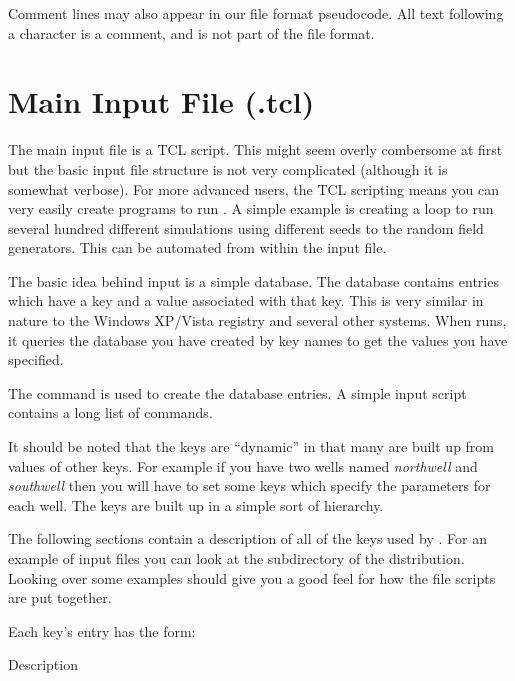 Comment lines may also appear in our file format pseudocode.
All text following a \code{#} character is a comment,
and is not part of the file format.


\section{Main Input File (.tcl)}
\label{Main Input File (.tcl)}

The main \parflow{} input file is a TCL script.  This might seem
overly combersome at first but the basic input file structure is not
very complicated (although it is somewhat verbose).  For more advanced
users, the TCL scripting means you can very easily create programs to
run \parflow{}.  A simple example is creating a loop to run several
hundred different simulations using different seeds to the random field
generators.  This can be automated from within the \parflow{} input file.

The basic idea behind \parflow{} input is a simple database.  The
database contains entries which have a key and a value associated with
that key.  This is very similar in nature to the Windows XP/Vista
registry and several other systems.  When \parflow{} runs, it
queries the database you have created by key names to get the values
you have specified.

The command  is used to create the database entries.  A
simple \parflow{} input script contains a long list of
 commands.

It should be noted that the keys are ``dynamic'' in that many are
built up from values of other keys.  For example if you have two wells
named {\em northwell} and {\em southwell} then you will have to set some keys
which specify the parameters for each well.  The keys are built up in
a simple sort of hierarchy.

The following sections contain a description of all of the keys used by
\parflow{}.  For an example of input files you can look at the
 subdirectory of the \parflow{} distribution.  Looking
over some examples should give you a good feel for how the
file scripts are put together.

Each key's entry has the form:

{Description}{}

